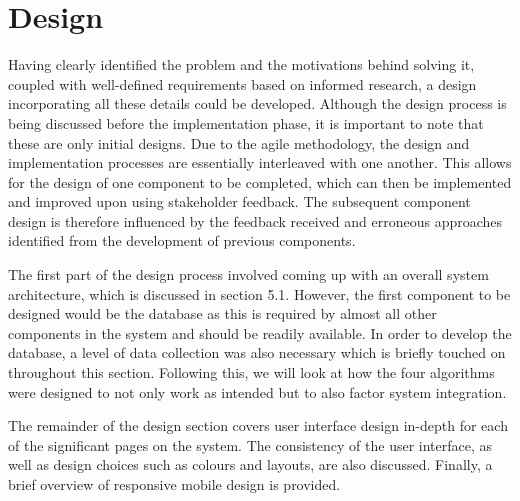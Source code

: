 \chapter{Design}
\label{Chapter:Design}
Having clearly identified the problem and the motivations behind solving it, coupled with well-defined requirements based on informed research, a design incorporating all these details could be developed. Although the design process is being discussed before the implementation phase, it is important to note that these are only initial designs. Due to the agile methodology, the design and implementation processes are essentially interleaved with one another. This allows for the design of one component to be completed, which can then be implemented and improved upon using stakeholder feedback. The subsequent component design is therefore influenced by the feedback received and erroneous approaches identified from the development of previous components.

The first part of the design process involved coming up with an overall system architecture, which is discussed in section 5.1. However, the first component to be designed would be the database as this is required by almost all other components in the system and should be readily available. In order to develop the database, a level of data collection was also necessary which is briefly touched on throughout this section. Following this, we will look at how the four algorithms were designed to not only work as intended but to also factor system integration.

The remainder of the design section covers user interface design in-depth for each of the significant pages on the system. The consistency of the user interface, as well as design choices such as colours and layouts, are also discussed. Finally, a brief overview of responsive mobile design is provided.








